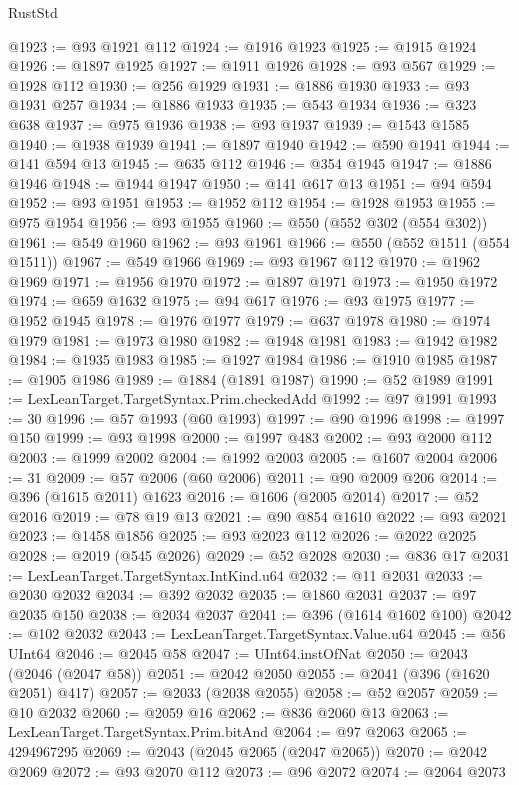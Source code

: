 \begin{lexlean}{RustStd}
\begin{coremodule}
@1923 := @93 @1921 @112
@1924 := @1916 @1923
@1925 := @1915 @1924
@1926 := @1897 @1925
@1927 := @1911 @1926
@1928 := @93 @567
@1929 := @1928 @112
@1930 := @256 @1929
@1931 := @1886 @1930
@1933 := @93 @1931 @257
@1934 := @1886 @1933
@1935 := @543 @1934
@1936 := @323 @638
@1937 := @975 @1936
@1938 := @93 @1937
@1939 := @1543 @1585
@1940 := @1938 @1939
@1941 := @1897 @1940
@1942 := @590 @1941
@1944 := @141 @594 @13
@1945 := @635 @112
@1946 := @354 @1945
@1947 := @1886 @1946
@1948 := @1944 @1947
@1950 := @141 @617 @13
@1951 := @94 @594
@1952 := @93 @1951
@1953 := @1952 @112
@1954 := @1928 @1953
@1955 := @975 @1954
@1956 := @93 @1955
@1960 := @550 (@552 @302 (@554 @302))
@1961 := @549 @1960
@1962 := @93 @1961
@1966 := @550 (@552 @1511 (@554 @1511))
@1967 := @549 @1966
@1969 := @93 @1967 @112
@1970 := @1962 @1969
@1971 := @1956 @1970
@1972 := @1897 @1971
@1973 := @1950 @1972
@1974 := @659 @1632
@1975 := @94 @617
@1976 := @93 @1975
@1977 := @1952 @1945
@1978 := @1976 @1977
@1979 := @637 @1978
@1980 := @1974 @1979
@1981 := @1973 @1980
@1982 := @1948 @1981
@1983 := @1942 @1982
@1984 := @1935 @1983
@1985 := @1927 @1984
@1986 := @1910 @1985
@1987 := @1905 @1986
@1989 := @1884 (@1891 @1987)
@1990 := @52 @1989
@1991 := LexLeanTarget.TargetSyntax.Prim.checkedAdd
@1992 := @97 @1991
@1993 := 30
@1996 := @57 @1993 (@60 @1993)
@1997 := @90 @1996
@1998 := @1997 @150
@1999 := @93 @1998
@2000 := @1997 @483
@2002 := @93 @2000 @112
@2003 := @1999 @2002
@2004 := @1992 @2003
@2005 := @1607 @2004
@2006 := 31
@2009 := @57 @2006 (@60 @2006)
@2011 := @90 @2009 @206
@2014 := @396 (@1615 @2011) @1623
@2016 := @1606 (@2005 @2014)
@2017 := @52 @2016
@2019 := @78 @19 @13
@2021 := @90 @854 @1610
@2022 := @93 @2021
@2023 := @1458 @1856
@2025 := @93 @2023 @112
@2026 := @2022 @2025
@2028 := @2019 (@545 @2026)
@2029 := @52 @2028
@2030 := @836 @17
@2031 := LexLeanTarget.TargetSyntax.IntKind.u64
@2032 := @11 @2031
@2033 := @2030 @2032
@2034 := @392 @2032
@2035 := @1860 @2031
@2037 := @97 @2035 @150
@2038 := @2034 @2037
@2041 := @396 (@1614 @1602 @100)
@2042 := @102 @2032
@2043 := LexLeanTarget.TargetSyntax.Value.u64
@2045 := @56 UInt64
@2046 := @2045 @58
@2047 := UInt64.instOfNat
@2050 := @2043 (@2046 (@2047 @58))
@2051 := @2042 @2050
@2055 := @2041 (@396 (@1620 @2051) @417)
@2057 := @2033 (@2038 @2055)
@2058 := @52 @2057
@2059 := @10 @2032
@2060 := @2059 @16
@2062 := @836 @2060 @13
@2063 := LexLeanTarget.TargetSyntax.Prim.bitAnd
@2064 := @97 @2063
@2065 := 4294967295
@2069 := @2043 (@2045 @2065 (@2047 @2065))
@2070 := @2042 @2069
@2072 := @93 @2070 @112
@2073 := @96 @2072
@2074 := @2064 @2073

\end{coremodule}
\end{lexlean}
